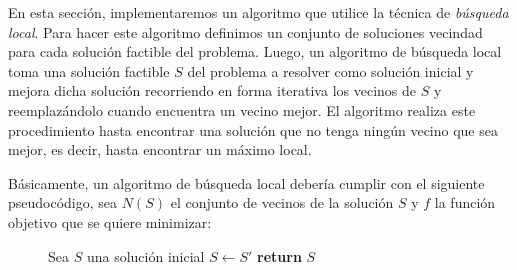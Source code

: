 En esta sección, implementaremos un algoritmo que utilice la técnica de \emph{búsqueda local}. Para hacer este algoritmo definimos un conjunto de soluciones vecindad para cada solución factible del problema. Luego, un algoritmo de búsqueda local toma una solución factible $S$ del problema a resolver como solución inicial y mejora dicha solución recorriendo en forma iterativa los vecinos de $S$ y reemplazándolo cuando encuentra un vecino mejor. El algoritmo realiza este procedimiento hasta encontrar una solución que no tenga ningún vecino que sea mejor, es decir, hasta encontrar un máximo local.

Básicamente, un algoritmo de búsqueda local debería cumplir con el siguiente pseudocódigo, sea $N(S)$ el conjunto de vecinos de la solución $S$ y $f$ la función objetivo que se quiere minimizar:

\begin{center}
 \begin{figure}[H]
  \begin{pseudo}
   \State Sea $S$ una solución inicial
      \State $S \leftarrow S'$
   \EndWhile
   \State \textbf{return} $S$
   \EndProcedure
  \end{pseudo}
 \end{figure}
\end{center}
